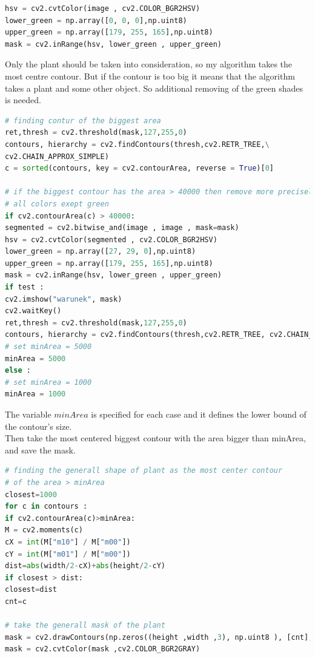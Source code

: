 \documentclass[12pt]{article}
\begin{document}
\begin{lstlisting}[language=Python]
hsv = cv2.cvtColor(image , cv2.COLOR_BGR2HSV)
lower_green = np.array([0, 0, 0],np.uint8)
upper_green = np.array([179, 255, 165],np.uint8)
mask = cv2.inRange(hsv, lower_green , upper_green)
\end{lstlisting}

Only the plant should be taken into consideration, so my algorithm takes the most centre contour. But if the contour is too big it means that the algorithm takes a plant and some other object. So additional removing of the green shades is needed.

\begin{lstlisting}[language=Python]
# finding contur of the biggest area
ret,thresh = cv2.threshold(mask,127,255,0)
contours, hierarchy = cv2.findContours(thresh,cv2.RETR_TREE,\
cv2.CHAIN_APPROX_SIMPLE)
c = sorted(contours, key = cv2.contourArea, reverse = True)[0]

# if the biggest contour has the area > 40000 then remove more precisely
# all colors exept green
if cv2.contourArea(c) > 40000:
segmented = cv2.bitwise_and(image , image , mask=mask)
hsv = cv2.cvtColor(segmented , cv2.COLOR_BGR2HSV)
lower_green = np.array([27, 29, 0],np.uint8)
upper_green = np.array([179, 255, 165],np.uint8)
mask = cv2.inRange(hsv, lower_green , upper_green)
if test :
cv2.imshow("warunek", mask)
cv2.waitKey()
ret,thresh = cv2.threshold(mask,127,255,0)
contours, hierarchy = cv2.findContours(thresh,cv2.RETR_TREE, cv2.CHAIN_APPROX_SIMPLE)
# set minArea = 5000
minArea = 5000
else :
# set minArea = 1000
minArea = 1000
\end{lstlisting}

The variable $minArea$ is specified for each case and it defines the lower bound of the contour's size.\\
Then take the most centered biggest contour with the area bigger than minArea, and save the mask.

\begin{lstlisting}[language=Python]
# finding the generall shape of plant as the most center contour
# of the area > minArea
closest=1000
for c in contours :
if cv2.contourArea(c)>minArea:
M = cv2.moments(c)
cX = int(M["m10"] / M["m00"])
cY = int(M["m01"] / M["m00"])
dist=abs(width/2-cX)+abs(height/2-cY)
if closest > dist:
closest=dist
cnt=c

# take the generall mask of the plant
mask = cv2.drawContours(np.zeros((height ,width ,3), np.uint8 ), [cnt], 0, (255,255,255), cv2.FILLED)
mask = cv2.cvtColor(mask ,cv2.COLOR_BGR2GRAY)
\end{lstlisting}
\end{document}
